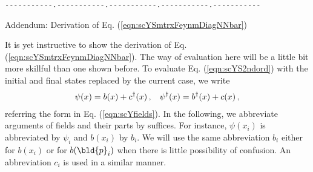 \bigskip

\verb/-----------.-----------.-----------.-----------.-----------/\\
\vspace{-3mm}
{\small
\begin{center}
Addendum: Derivation of Eq. (\ref{eqn:scYSmtrxFeynmDiagNNbar})
\end{center}

It is yet instructive to show the derivation of Eq. (\ref{eqn:scYSmtrxFeynmDiagNNbar}).
The way of evaluation here will be a little bit more skillful than one shown before.
To evaluate Eq. (\ref{eqn:scYS2ndord}) with the initial and final states replaced 
by the current case, we write
\begin{eqnarray}
\psi(x) = b(x) + c^\dagger(x)\,,
\hspace{3mm}
\psi^\dagger(x) = b^\dagger(x) + c(x)\,,
\end{eqnarray}
referring the form in Eq. (\ref{eqn:scYfields}).
In the following, we abbreviate arguments of fields and their parts by suffices.
For instance, $\psi(x_i)$ is abbreviated by $\psi_i$ and $b(x_i)$ by $b_i$.
We will use the same abbreviation $b_i$ either for $b(x_i)$ or for $b(\bld{p}_i)$ 
when there is little possibility of confusion.
An abbreviation $c_i$ is used in a similar manner.

}
